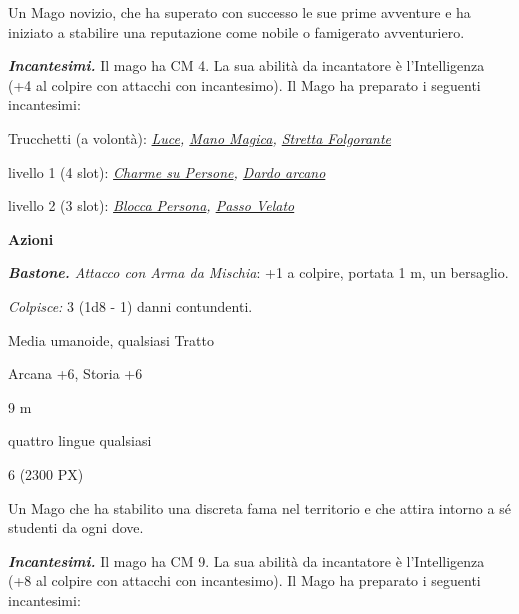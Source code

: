 \begin{multicols}{2}
{Un Mago novizio, che ha superato con successo le sue prime avventure e ha iniziato a stabilire una reputazione come nobile o famigerato avventuriero.

\emph{\textbf{Incantesimi.}} Il mago ha CM 4. La sua abilità da incantatore è l'Intelligenza (+4 al colpire con attacchi con incantesimo). Il Mago ha preparato i seguenti incantesimi:

Trucchetti (a volontà): \emph{\hyperlink{Luce}{Luce}, \hyperlink{Mano Magica}{Mano Magica}, \hyperlink{Stretta Folgorante}{Stretta Folgorante}}

livello 1 (4 slot): \emph{\hyperlink{Charme su Persone}{Charme su Persone},  \hyperlink{Dardo arcano}{Dardo arcano}}

livello 2 (3 slot): \emph{\hyperlink{Blocca Persona}{Blocca Persona}, \hyperlink{Passo Velato}{Passo Velato}}

\textbf{Azioni}

\emph{\textbf{Bastone.} Attacco con Arma da Mischia}: +1 a colpire, portata 1 m, un bersaglio.

\emph{Colpisce:} 3 (1d8 - 1) danni contundenti.

\begin{description}[noitemsep, topsep=0pt, parsep=0pt, partopsep=0pt, itemsep=1pt, leftmargin=2.35cm,  labelwidth=2.2cm, itemindent=0cm, listparindent=0pt] %
\setlength{\baselineskip}{10pt}
\item[\textbf{Taglia/Tipo}] Media umanoide, qualsiasi Tratto
\item[\textbf{Caratt.}] 
\item[\textbf{Punti Ferita}] 
\item[\textbf{Comp.}] Arcana +6, Storia +6
\item[\textbf{Tiri Salvez.}] 
\item[\textbf{Movimento}] 9 m
\item[\textbf{Linguaggi}] quattro lingue qualsiasi
\item[\textbf{Sfida}] 6 (2300 PX)
\end{description}
\smallskip

Un Mago che ha stabilito una discreta fama nel territorio e che attira intorno a sé studenti da ogni dove.

\emph{\textbf{Incantesimi.}} Il mago ha CM 9. La sua abilità da incantatore è l'Intelligenza (+8 al colpire con attacchi con incantesimo). Il Mago ha preparato i seguenti incantesimi:

}
\end{multicols}

